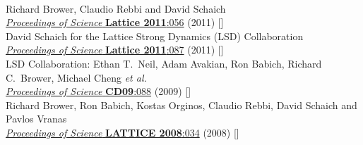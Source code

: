 \begin{spacelist}
\begin{revnumerate}
    \pagebreakitem
       \\
      Richard Brower, Claudio Rebbi and David Schaich \\
      \href{https://doi.org/10.22323/1.139.0056}{\textit{Proceedings of Science} \textbf{Lattice 2011}:056} (2011) []
    \pagebreakitem
       \\
      David Schaich for the Lattice Strong Dynamics (LSD) Collaboration \\
      \href{https://doi.org/10.22323/1.139.0087}{\textit{Proceedings of Science} \textbf{Lattice 2011}:087} (2011) []
    \pagebreakitem
       \\
      LSD Collaboration: Ethan T.~Neil, Adam Avakian, Ron Babich, Richard C.~Brower, Michael Cheng \textit{et al.} \\ %
      \href{https://doi.org/10.22323/1.086.0088}{\textit{Proceedings of Science} \textbf{CD09}:088} (2009) []
    \pagebreakitem
       \\
      Richard Brower, Ron Babich, Kostas Orginos, Claudio Rebbi, David Schaich and Pavlos Vranas \\
      \href{https://doi.org/10.22323/1.066.0034}{\textit{Proceedings of Science} \textbf{LATTICE 2008}:034} (2008) []
  \end{revnumerate}
%
%
%
\begin{comment} %
\vspace{20 pt} {\large \bfseries In active preparation} \hfill(ordered by anticipated completion)
  \pagebreakitem
    \optem{Nonperturbative ingredients for stochastic gravitational wave predictions} \\
    Venkitesh Ayyar, Ethan T.~Neil, Enrico Rinaldi and David Schaich \\
  \pagebreakitem
    \optem{Plane wave matrix model at finite temperatures on the lattice} \\

\end{comment}
\end{spacelist}
